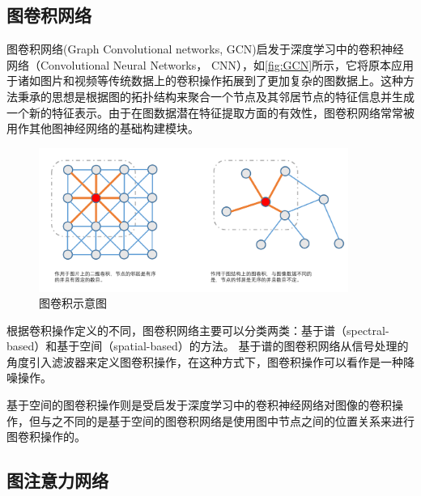 \subsection{图卷积网络}
图卷积网络(Graph Convolutional networks, GCN)启发于深度学习中的卷积神经网络（Convolutional Neural Networks， CNN），如\autoref{fig:GCN}所示，它将原本应用于诸如图片和视频等传统数据上的卷积操作拓展到了更加复杂的图数据上。这种方法秉承的思想是根据图的拓扑结构来聚合一个节点及其邻居节点的特征信息并生成一个新的特征表示。由于在图数据潜在特征提取方面的有效性，图卷积网络常常被用作其他图神经网络的基础构建模块。
\begin{figure}[htb]
    \includegraphics[width=0.9\textwidth]{fig/GCN.pdf}
    \caption{图卷积示意图}
    \label{fig:GCN}
  \end{figure}
根据卷积操作定义的不同，图卷积网络主要可以分类两类：基于谱（spectral-based）和基于空间（spatial-based）的方法。
基于谱的图卷积网络从信号处理的角度引入滤波器来定义图卷积操作，在这种方式下，图卷积操作可以看作是一种降噪操作。

基于空间的图卷积操作则是受启发于深度学习中的卷积神经网络对图像的卷积操作，但与之不同的是基于空间的图卷积网络是使用图中节点之间的位置关系来进行图卷积操作的。

\subsection{图注意力网络}

